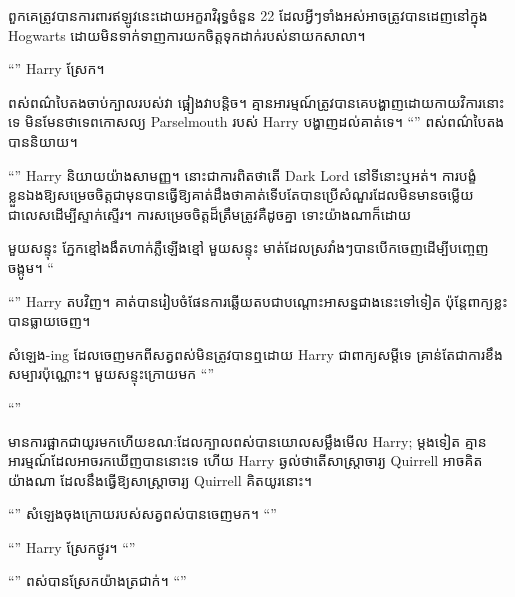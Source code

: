 ពួកគេត្រូវបានការពារឥឡូវនេះដោយអក្ខរាវិរុទ្ធចំនួន 22 ដែលអ្វីៗទាំងអស់អាចត្រូវបានដេញនៅក្នុង Hogwarts ដោយមិនទាក់ទាញការយកចិត្តទុកដាក់របស់នាយកសាលា។

“” Harry ស្រែក។

ពស់ពណ៌បៃតងចាប់ក្បាលរបស់វា ផ្អៀងវាបន្តិច។ គ្មាន​អារម្មណ៍​ត្រូវ​បាន​គេ​បង្ហាញ​ដោយ​កាយវិការ​នោះ​ទេ មិនមែន​ថា​ទេពកោសល្យ Parselmouth របស់ Harry បង្ហាញ​ដល់​គាត់​ទេ។ “” ពស់ពណ៌បៃតងបាននិយាយ។

“” Harry និយាយយ៉ាងសាមញ្ញ។ នោះជាការពិតថាតើ Dark Lord នៅទីនោះឬអត់។ ការបង្ខំខ្លួនឯងឱ្យសម្រេចចិត្តជាមុនបានធ្វើឱ្យគាត់ដឹងថាគាត់ទើបតែបានប្រើសំណួរដែលមិនមានចម្លើយជាលេសដើម្បីស្ទាក់ស្ទើរ។ ការសម្រេចចិត្តដ៏ត្រឹមត្រូវគឺដូចគ្នា ទោះយ៉ាងណាក៏ដោយ

មួយសន្ទុះ ភ្នែកខ្មៅងងឹតហាក់ភ្លឺឡើងខ្មៅ មួយសន្ទុះ មាត់ដែលស្រវាំងៗបានបើកចេញដើម្បីបញ្ចេញចង្កូម។ “

“” Harry តបវិញ។ គាត់​បាន​រៀបចំ​ផែនការ​ឆ្លើយតប​ជា​បណ្ដោះអាសន្ន​ជាង​នេះ​ទៅ​ទៀត ប៉ុន្តែ​ពាក្យ​ខ្លះ​បាន​ធ្លាយ​ចេញ។

សំឡេង-ing ដែលចេញមកពីសត្វពស់មិនត្រូវបានឮដោយ Harry ជាពាក្យសម្ដីទេ គ្រាន់តែជាការខឹងសម្បារប៉ុណ្ណោះ។ មួយសន្ទុះក្រោយមក “”

“”

មាន​ការ​ផ្អាក​ជា​យូរ​មក​ហើយ​ខណៈ​ដែល​ក្បាល​ពស់​បាន​យោល​សម្លឹង​មើល Harry; ម្ដងទៀត គ្មានអារម្មណ៍ដែលអាចរកឃើញបាននោះទេ ហើយ Harry ឆ្ងល់ថាតើសាស្រ្តាចារ្យ Quirrell អាចគិតយ៉ាងណា ដែលនឹងធ្វើឱ្យសាស្រ្តាចារ្យ Quirrell គិតយូរនោះ។

“” សំឡេងចុងក្រោយរបស់សត្វពស់បានចេញមក។ “”

“” Harry ស្រែកថ្ងូរ។ “”

“” ពស់​បាន​ស្រែក​យ៉ាង​ត្រជាក់។ “”

